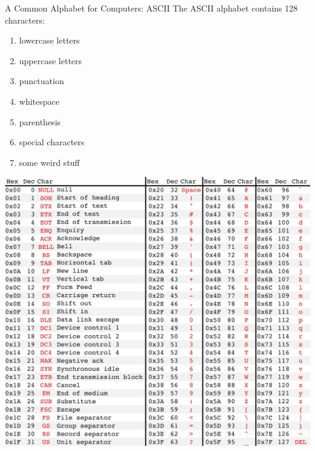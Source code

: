 \documentclass[professionalfonts, xcolor={usenames,svgnames,x11names,table}]{beamer}
\begin{document}
\begin{frame}{A Common Alphabet for Computers: ASCII}
    The ASCII alphabet contains 128 characters:
    \begin{enumerate}
        \item lowercase letters\\
        \item uppercase letters\\
        \item punctuation\\
        \item whitespace\\
        \item parenthesis\\
            \subpoint{( ) [ ] \{ \}}
        \item special characters\\
        \item some weird stuff\\
    \end{enumerate}
\end{frame}

\begin{frame}
    \begin{center}
        \includegraphics[width=.9\linewidth]{./img/ascii_table}
    \end{center}
\end{frame}
\end{document}
